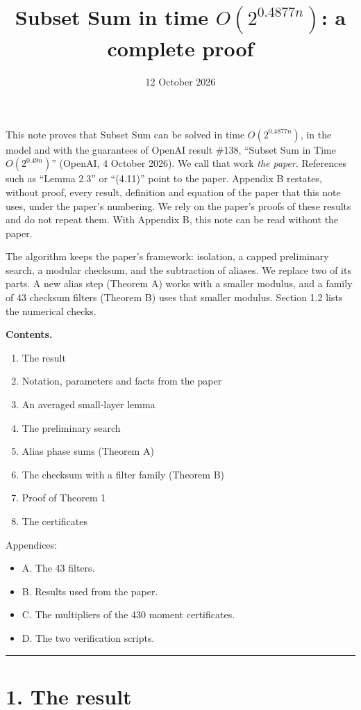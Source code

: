 \documentclass[10pt,a4paper]{article}
\title{Subset Sum in time $O(2^{0.4877n})$: a complete proof}
\author{}
\date{12 October 2026}
\begin{document}
\maketitle
This note proves that Subset Sum can be solved in time $O(2^{0.4877n})$, in the model and with the guarantees of
OpenAI result \#138, ``Subset Sum in Time $O(2^{0.49n})$'' (OpenAI, 4 October 2026). We call that work \emph{the paper}.
References such as ``Lemma 2.3'' or ``(4.11)'' point to the paper. Appendix B restates, without proof, every result,
definition and equation of the paper that this note uses, under the paper's numbering. We rely on the paper's proofs of
these results and do not repeat them. With Appendix B, this note can be read without the paper.

The algorithm keeps the paper's framework: isolation, a capped preliminary search, a modular checksum, and the
subtraction of aliases. We replace two of its parts. A new alias step (Theorem A) works with a smaller modulus, and a
family of 43 checksum filters (Theorem B) uses that smaller modulus. Section 1.2 lists the numerical checks.

\textbf{Contents.}

\begin{enumerate}
\item The result
\item Notation, parameters and facts from the paper
\item An averaged small-layer lemma
\item The preliminary search
\item Alias phase sums (Theorem A)
\item The checksum with a filter family (Theorem B)
\item Proof of Theorem 1
\item The certificates
\end{enumerate}

Appendices:

\begin{itemize}
\item A. The 43 filters.
\item B. Results used from the paper.
\item C. The multipliers of the 430 moment certificates.
\item D. The two verification scripts.
\end{itemize}

\medskip\noindent\rule{\linewidth}{0.4pt}\medskip

\section*{1. The result}
\end{document}
